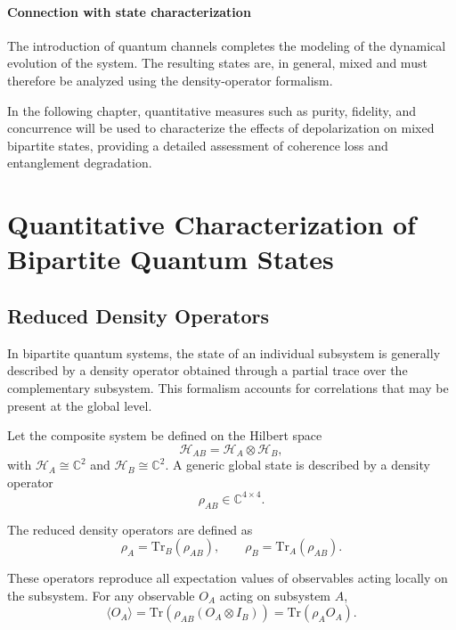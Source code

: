 \documentclass[a4paper]{article}
\begin{document}
\paragraph{Connection with state characterization}

The introduction of quantum channels completes the modeling of the dynamical evolution of the system. The resulting states are, in general, mixed and must therefore be analyzed using the density-operator formalism.

In the following chapter, quantitative measures such as purity, fidelity, and concurrence will be used to characterize the effects of depolarization on mixed bipartite states, providing a detailed assessment of coherence loss and entanglement degradation.



\section{Quantitative Characterization of Bipartite Quantum States}

\subsection{Reduced Density Operators}

In bipartite quantum systems, the state of an individual subsystem is generally described by a density operator obtained through a partial trace over the complementary subsystem. This formalism accounts for correlations that may be present at the global level.

Let the composite system be defined on the Hilbert space
\[
\mathcal{H}_{AB} = \mathcal{H}_A \otimes \mathcal{H}_B,
\]
with $\mathcal{H}_A \cong \mathbb{C}^2$ and $\mathcal{H}_B \cong \mathbb{C}^2$. A generic global state is described by a density operator
\[
\rho_{AB} \in \mathbb{C}^{4 \times 4}.
\]

The reduced density operators are defined as
\[
\rho_A = \mathrm{Tr}_B(\rho_{AB}), \qquad
\rho_B = \mathrm{Tr}_A(\rho_{AB}).
\]

These operators reproduce all expectation values of observables acting locally on the subsystem. For any observable $O_A$ acting on subsystem $A$,
\[
\langle O_A \rangle = \mathrm{Tr}(\rho_{AB}(O_A \otimes I_B)) = \mathrm{Tr}(\rho_A O_A).
\]
\end{document}

